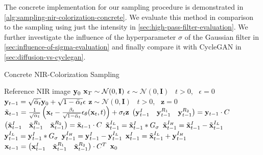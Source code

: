 The concrete implementation for our sampling procedure is demonstrated in \autoref{alg:sampling-nir-colorization-concrete}.
We evaluate this method in comparison to the sampling using just the intensity in \autoref{sec:high-pass-filter-evaluation}.
We further investigate the influence of the hyperparameter $\sigma$ of the Gaussian filter in \autoref{sec:influence-of-sigma-evaluation}
and finally compare it with CycleGAN in \autoref{sec:diffusion-vs-cyclegan}.

\begin{algorithm}[htp!]
   \caption{Concrete NIR-Colorization Sampling}
   \label{alg:sampling-nir-colorization-concrete}
   \begin{algorithmic}
      \Require Reference NIR image $\mathbf{y}_0$
      \State $\mathbf{x}_T \sim \mathcal{N}(0, \mathbf{I})$
      \State $\epsilon \sim \mathcal{N}(0, \mathbf{I})$ \algorithmicif\ $t > 0$, \algorithmicelse\ $\epsilon = 0$
      \State $\mathbf{y}_{t-1} = \sqrt{\bar{\alpha}_t}\mathbf{y}_{0} + \sqrt{1 - \bar{\alpha}_t} \epsilon$
      \State $\mathbf{z} \sim \mathcal{N}(0, \mathbf{I})$ \algorithmicif\ $t > 0$, \algorithmicelse\ $\mathbf{z} = 0$
      \State $\tilde{\mathbf{x}}_{t-1} = \frac{1}{\sqrt{\alpha_t}} \left(\mathbf{x}_t - \frac{\beta_t}{\sqrt{1 - \bar{\alpha}_t}} \epsilon_\theta(\mathbf{x}_t, t) \right) + \sigma_t \mathbf{z}$
      \State $\begin{pmatrix}\mathbf{y}_{t-1}^I & \mathbf{y}_{t-1}^{R_1} & \mathbf{y}_{t-1}^{R_2}\end{pmatrix} = \mathbf{y}_{t-1} \cdot C$
      \State $\begin{pmatrix}\tilde{\mathbf{x}}_{t-1}^I & \tilde{\mathbf{x}}_{t-1}^{R_1} & \tilde{\mathbf{x}}_{t-1}^{R_2}\end{pmatrix} = \tilde{\mathbf{x}}_{t-1} \cdot C$
      \State $\tilde{\mathbf{x}}_{t-1}^{I_L} = \tilde{\mathbf{x}}_{t-1}^I * G_\sigma$
      \State $\tilde{\mathbf{x}}_{t-1}^{I_H} = \tilde{\mathbf{x}}_{t-1}^I - \tilde{\mathbf{x}}_{t-1}^{I_L}$
      \State $\mathbf{y}_{t-1}^{I_L} = \mathbf{y}_{t-1}^{I} * G_\sigma$
      \State $\mathbf{y}_{t-1}^{I_H} = \mathbf{y}_{t-1}^{I} - \mathbf{y}_{t-1}^{I_L}$
      \State $\mathbf{x}_{t-1}^I = \tilde{\mathbf{x}}_{t-1}^{I_L} + \mathbf{y}_{t-1}^{I_H}$
      \State $\mathbf{x}_{t-1} = \begin{pmatrix}\mathbf{x}_{t-1}^I & \tilde{\mathbf{x}}_{t-1}^{R_1} & \tilde{\mathbf{x}}_{t-1}^{R_2} \end{pmatrix} \cdot C^T$
      \EndFor
      \Return $\mathbf{x}_0$
   \end{algorithmic}
\end{algorithm}


